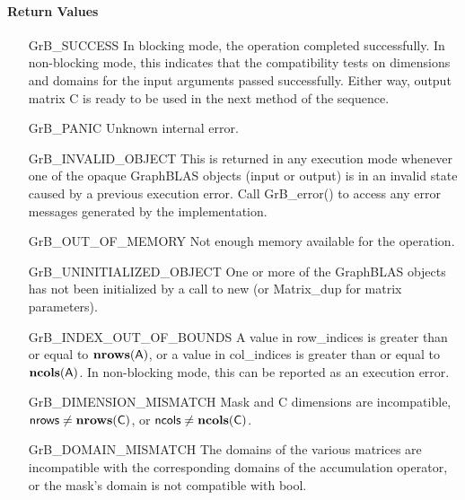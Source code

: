 \paragraph{Return Values}

\begin{itemize}[leftmargin=2.1in]
    \item[{\sf GrB\_SUCCESS}]         In blocking mode, the operation completed
    successfully. In non-blocking mode, this indicates that the compatibility 
    tests on dimensions and domains for the input arguments passed successfully. 
    Either way, output matrix {\sf C} is ready to be used in the next method of
    the sequence.

    \item[{\sf GrB\_PANIC}]           Unknown internal error.

    \item[{\sf GrB\_INVALID\_OBJECT}] This is returned in any execution mode 
    whenever one of the opaque GraphBLAS objects (input or output) is in an invalid 
    state caused by a previous execution error.  Call {\sf GrB\_error()} to access 
    any error messages generated by the implementation.

    \item[{\sf GrB\_OUT\_OF\_MEMORY}] Not enough memory available for the operation.

    \item[{\sf GrB\_UNINITIALIZED\_OBJECT}] One or more of the GraphBLAS objects 
    has not been initialized by a call to {\sf new} (or {\sf Matrix\_dup} for matrix
    parameters).

    \item[{\sf GrB\_INDEX\_OUT\_OF\_BOUNDS}]  A value in {\sf row\_indices} 
    is greater than or equal to $\bold{nrows}({\sf A})$, or a value in 
    {\sf col\_indices} is greater than or equal to $\bold{ncols}({\sf A})$.  In 
    non-blocking mode, this can be reported as an execution error.
    
    \item[{\sf GrB\_DIMENSION\_MISMATCH}] {\sf Mask} and {\sf C}
    dimensions are incompatible, ${\sf nrows} \neq \bold{nrows}({\sf C})$, or 
    ${\sf ncols} \neq \bold{ncols}({\sf C})$.

    \item[{\sf GrB\_DOMAIN\_MISMATCH}]    The domains of the various matrices are
    incompatible with the corresponding domains of the 
    accumulation operator, or the mask's domain is not compatible with {\sf bool}.
\end{itemize}

